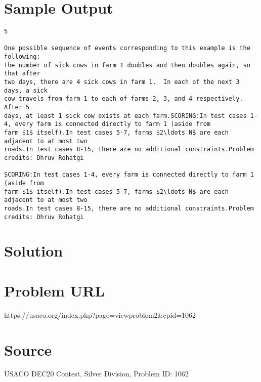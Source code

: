 \documentclass[12pt]{article}
\begin{document}
\section*{Sample Output}
\begin{verbatim}
5

One possible sequence of events corresponding to this example is the following:
the number of sick cows in farm 1 doubles and then doubles again, so that after
two days, there are 4 sick cows in farm 1.  In each of the next 3 days, a sick
cow travels from farm 1 to each of farms 2, 3, and 4 respectively.  After 5
days, at least 1 sick cow exists at each farm.SCORING:In test cases 1-4, every farm is connected directly to farm 1 (aside from
farm $1$ itself).In test cases 5-7, farms $2\ldots N$ are each adjacent to at most two
roads.In test cases 8-15, there are no additional constraints.Problem credits: Dhruv Rohatgi

SCORING:In test cases 1-4, every farm is connected directly to farm 1 (aside from
farm $1$ itself).In test cases 5-7, farms $2\ldots N$ are each adjacent to at most two
roads.In test cases 8-15, there are no additional constraints.Problem credits: Dhruv Rohatgi
\end{verbatim}

\section*{Solution}


\section*{Problem URL}
https://usaco.org/index.php?page=viewproblem2&cpid=1062

\section*{Source}
USACO DEC20 Contest, Silver Division, Problem ID: 1062
\end{document}
